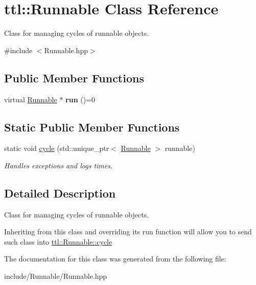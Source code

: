 \hypertarget{classttl_1_1_runnable}{\section{ttl\-:\-:Runnable Class Reference}
\label{classttl_1_1_runnable}
}


Class for managing cycles of runnable objects.  




{\ttfamily \#include $<$Runnable.\-hpp$>$}

\subsection*{Public Member Functions}
\begin{DoxyCompactItemize}
\item 
\hypertarget{classttl_1_1_runnable_af6956d428e33c97a44fe01e707f20c49}{virtual \hyperlink{classttl_1_1_runnable}{Runnable} $\ast$ {\bfseries run} ()=0}\label{classttl_1_1_runnable_af6956d428e33c97a44fe01e707f20c49}

\end{DoxyCompactItemize}
\subsection*{Static Public Member Functions}
\begin{DoxyCompactItemize}
\item 
\hypertarget{classttl_1_1_runnable_aa959aaca8db913584fba289ee9119344}{static void \hyperlink{classttl_1_1_runnable_aa959aaca8db913584fba289ee9119344}{cycle} (std\-::unique\-\_\-ptr$<$ \hyperlink{classttl_1_1_runnable}{Runnable} $>$ runnable)}\label{classttl_1_1_runnable_aa959aaca8db913584fba289ee9119344}

\begin{DoxyCompactList}\small\item\em Handles exceptions and logs times. \end{DoxyCompactList}\end{DoxyCompactItemize}


\subsection{Detailed Description}
Class for managing cycles of runnable objects. 

Inheriting from this class and overriding its run function will allow you to send such class into \hyperlink{classttl_1_1_runnable_aa959aaca8db913584fba289ee9119344}{ttl\-::\-Runnable\-::cycle} 

The documentation for this class was generated from the following file\-:\begin{DoxyCompactItemize}
\item 
include/\-Runnable/Runnable.\-hpp\end{DoxyCompactItemize}
